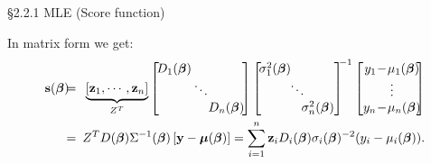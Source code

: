 \documentclass{beamer}
\newcommand{\boldbeta}{{\boldsymbol \beta}}
\begin{document}
\begin{frame}{\S2.2.1 MLE (Score function)}
\begin{itemize}
\end{itemize}
In matrix form we get:
\begin{eqnarray*}
\textbf{s}(\mbox{\boldmath $\beta$})&\!\!\!=\!\!\!&  \underbrace{\left[\textbf{z}_1, \cdots, \textbf{z}_n\right] }_{Z^T} \left[\!\begin{array}{ccc}
\!\!\!D_1(\mbox{\boldmath $\beta$})\!\! & & \\
& \!\!\!\ddots\!\!\! & \\ & & \!\!\!D_n(\mbox{\boldmath $\beta$})\!\!\!\end{array}\!\right] 
\left[\begin{array}{ccc}\!\!\!\!\sigma_1^2(\mbox{\boldmath $\beta$}) \!\!\! & & \\
&\!\!\!\!\ddots \!\!\!\!& \\ & & \!\!\!\!\sigma_n^2(\mbox{\boldmath $\beta$})\!\!\!\end{array}\right]^{\!\!-1}
\left[\begin{array}{c} \!\!\!y_1\!-\!\mu_1(\mbox{\boldmath $\beta$}) \!\!\!\! \\
\!\!\!\vdots \!\!\!\! \\ \!\!\! y_n\!-\!\mu_n(\mbox{\boldmath $\beta$})\!\!\!\!\end{array}\!\right] \\
&\!\!\!\stackrel{\mbox{}}{=} \!\!\!& Z^TD(\mbox{\boldmath $\beta$})\Sigma^{-1}(\mbox{\boldmath $\beta$})
\left[\textbf{y}-\mbox{\boldmath $\mu$}(\mbox{\boldmath $\beta$})\right] = \sum_{i=1}^n {\bf z}_i D_i(\boldbeta) \sigma_i(\boldbeta)^{-2} (y_i - \mu_i (\boldbeta)).
\end{eqnarray*}
\end{frame}
\end{document}
